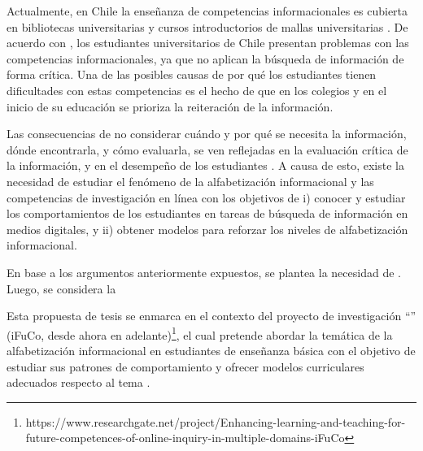 
Actualmente, en Chile la enseñanza de competencias informacionales es cubierta en bibliotecas universitarias y cursos introductorios de mallas universitarias \parencite{marzal2015diagnostico}. De acuerdo con \textcite{urra2016alfabetizacion}, los estudiantes universitarios de Chile presentan problemas con las competencias informacionales, ya que no aplican la búsqueda de información de forma crítica. Una de las posibles causas de por qué los estudiantes tienen dificultades con estas competencias es el hecho de que en los colegios y en el inicio de su educación se prioriza la reiteración de la información.

Las consecuencias de no considerar cuándo y por qué se necesita la información, dónde encontrarla, y cómo evaluarla, se ven reflejadas en la evaluación crítica de la información, y en el desempeño de los estudiantes \parencite{urra2016alfabetizacion}. A causa de esto, existe la necesidad de estudiar el fenómeno de la alfabetización informacional y las competencias de investigación en línea con los objetivos de i) conocer y estudiar los comportamientos de los estudiantes en tareas de búsqueda de información en medios digitales, y ii) obtener modelos para reforzar los niveles de alfabetización informacional.

En base a los argumentos anteriormente expuestos, se plantea la necesidad de . Luego, se considera la

Esta propuesta de tesis se enmarca en el contexto del proyecto de investigación “” (iFuCo, desde ahora en adelante)\footnote{https://www.researchgate.net/project/Enhancing-learning-and-teaching-for-future-competences-of-online-inquiry-in-multiple-domains-iFuCo}, el cual pretende abordar la temática de la alfabetización informacional en estudiantes de enseñanza básica con el objetivo de estudiar sus patrones de comportamiento y ofrecer modelos curriculares adecuados respecto al tema \parencite{sormen2017performance}.
